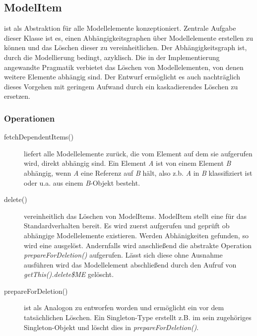 \subsection{ModelItem}

 ist als Abstraktion für alle Modellelemente konzeptioniert. 
Zentrale Aufgabe dieser Klasse ist es, einen Abhängigkeitsgraphen über Modellelemente erstellen zu können und 
das Löschen dieser zu vereinheitlichen. Der Abhängigkeitsgraph ist, durch die Modellierung bedingt, azyklisch.
Die in der Implementierung angewandte Pragmatik verbietet das Löschen von Modellelementen, von denen weitere Elemente 
abhängig sind. Der Entwurf ermöglicht es auch nachträglich dieses Vorgehen mit geringem Aufwand durch ein kaskadierendes Löschen zu 
ersetzen. 


\subsubsection{Operationen}

\begin{description}
\item[fetchDependentItems()] 
liefert alle Modellelemente zurück, die vom Element auf dem sie aufgerufen wird, direkt abhängig sind.
Ein Element \emph{A} ist von einem Element \emph{B} abhängig, wenn \emph{A} eine Referenz auf \emph{B} hält, also z.b.   
\emph{A} in \emph{B} klassifiziert ist oder u.a. aus einem \emph{B}-Objekt besteht.
 
\item[delete()] vereinheitlich das Löschen von ModelItems. ModelItem stellt eine  für das 
Standardverhalten bereit. Es wird zuerst  aufgerufen und geprüft ob abhängige Modellelemente 
existieren. Werden Abhänigkeiten gefunden, so wird eine  ausgelöst. Andernfalls wird anschließend 
die abstrakte Operation \emph{prepareForDeletion()} aufgerufen. Lässt sich diese ohne Ausnahme ausführen wird das Modellelement 
abschließend durch den Aufruf von \emph{getThis().delete\$ME} gelöscht.

\item[prepareForDeletion()] ist als Analogon zu  entworfen worden und ermöglicht ein 
 vor dem tatsächlichen Löschen. Ein Singleton-Type erstellt z.B. im  sein zugehöriges 
Singleton-Objekt und löscht dies in \emph{prepareForDeletion()}. 
\end{description}
